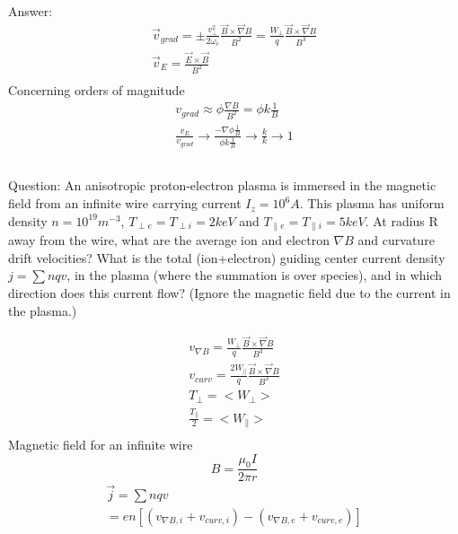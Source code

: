 \documentclass{article}
\begin{document}
Answer: 
\begin{eqnarray*}
    \vec{v}_{grad}=\pm \frac{v_\perp^2}{2\omega_c}\frac{\vec{B}\times \vec{\nabla} B}{B^2}=\frac{W_\perp}{q}\frac{\vec{B}\times \vec{\nabla}B}{B^3}\\
    \vec{v}_E=\frac{\vec{E}\times \vec{B}}{B^2}\\
\end{eqnarray*}
Concerning orders of magnitude
\begin{eqnarray*}
    v_{grad}\approx \phi \frac{\nabla B}{B^2}=\phi k \frac{1}{B}\\
    \frac{v_E}{v_{grad}}\rightarrow\frac{-\nabla \phi \frac{1}{B}}{\phi k \frac{1}{B}}\rightarrow\frac{k}{k}\rightarrow 1
\end{eqnarray*}

\subsection{}
Question: An anisotropic proton-electron plasma is immersed in the magnetic field from an infinite wire carrying current $I_z=10^6 A$.
This plasma has uniform density $n=10^{19}m^{-3}$, $T_{\perp e}= T_{\perp i}=2keV$ and $T_{\parallel e}=T_{\parallel i}=5 keV$.
At radius R away from the wire, what are the average ion and electron $\nabla B$ and curvature drift velocities?
What is the total (ion+electron) guiding center current density $j=\sum nqv$, in the plasma (where the summation is over species), and in which direction does this current flow?
(Ignore the magnetic field due to the current in the plasma.)

\begin{eqnarray*}
    v_{\nabla B}=\frac{W_\perp}{q}\frac{\vec{B}\times \vec{\nabla}B}{B^3}\\
    v_{curv}=\frac{2W_\parallel}{q}\frac{\vec{B}\times \vec{\nabla}B}{B^3}\\
    T_\perp=<W_\perp>\\
    \frac{T_\parallel}{2}=<W_\parallel>\\
\end{eqnarray*}
Magnetic field for an infinite wire
\begin{equation}
    B=\frac{\mu_0I}{2\pi r}
\end{equation}
\begin{eqnarray*}
    \vec{j}=\sum nqv\\
    =en[(v_{\nabla B,i}+v_{curv,i})-(v_{\nabla B,e}+v_{curv,e})]
\end{eqnarray*}
\end{document}
